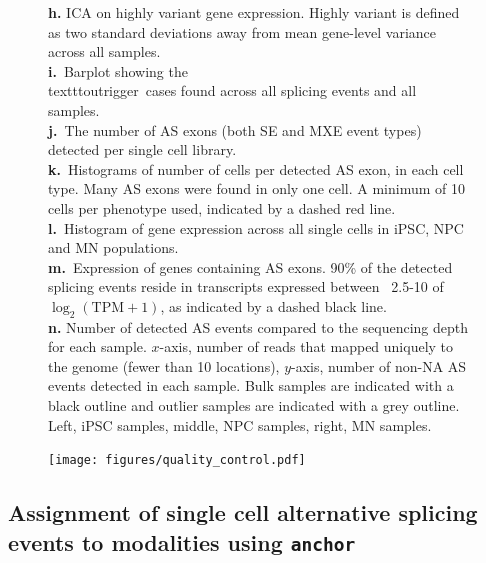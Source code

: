 \begin{figure}[h]
{\textbf{h.} ICA on highly variant gene expression. Highly variant is defined as two standard deviations away from mean gene-level variance across all samples.\\
\textbf{i.}~Barplot showing the \\texttt{outrigger}\, cases found across all splicing events and all samples.\\
\textbf{j.}~The number of AS exons (both SE and MXE event types) detected per single cell library. \\
\textbf{k.}~Histograms of number of cells per detected AS exon, in each cell type. Many AS exons were found in only one cell. A minimum of 10 cells per phenotype used, indicated by a dashed red line.\\
\textbf{l.}~Histogram of gene expression across all single cells in iPSC, NPC and MN populations.\\
\textbf{m.}~Expression of genes containing AS exons. 90\% of the detected splicing events reside in transcripts expressed between ~2.5-10 of $\log_2(\mathrm{TPM}+1)$, as indicated by a dashed black line. \\
\textbf{n.} Number of detected AS events compared to the sequencing depth for each sample. $x$-axis, number of reads that mapped uniquely to the genome (fewer than 10 locations), $y$-axis, number of non-NA AS events detected in each sample. Bulk samples are indicated with a black outline and outlier samples are indicated with a grey outline. Left, iPSC samples, middle, NPC samples, right, MN samples.
}
\label{fig:quality_control}
\end{figure}
\clearpage
\begin{figure}[h]
\ContinuedFloat
\captionsetup{labelformat=empty}
\centering
\texttt{[image: figures/quality\_control.pdf]}
\end{figure}
\clearpage

\subsection{Assignment of single cell alternative splicing events to modalities using \texttt{anchor}}

